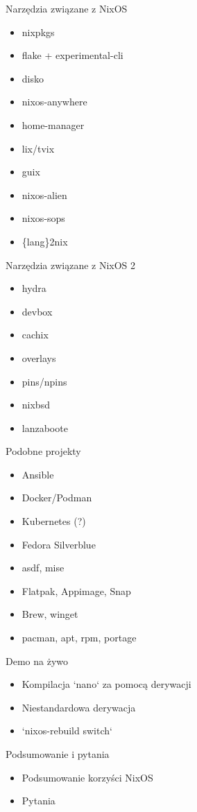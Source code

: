 \documentclass{beamer}
\begin{document}
\begin{frame}{Narzędzia związane z NixOS}
    \begin{itemize}
        \item nixpkgs
        \item flake + experimental-cli
        \item disko
        \item nixos-anywhere
        \item home-manager
        \item lix/tvix
        \item guix
        \item nixos-alien
        \item nixos-sops
        \item \{lang\}2nix
    \end{itemize}
\end{frame}

\begin{frame}{Narzędzia związane z NixOS 2}
    \begin{itemize}
        \item hydra
        \item devbox
        \item cachix
        \item overlays
        \item pins/npins
        \item nixbsd
        \item lanzaboote
    \end{itemize}
\end{frame}

\begin{frame}{Podobne projekty}
    \begin{itemize}
        \item Ansible
        \item Docker/Podman
        \item Kubernetes (?)
        \item Fedora Silverblue
        \item asdf, mise
        \item Flatpak, Appimage, Snap
        \item Brew, winget
        \item pacman, apt, rpm, portage
    \end{itemize}
\end{frame}

\begin{frame}{Demo na żywo}
    \begin{itemize}
        \item Kompilacja `nano` za pomocą derywacji
        \item Niestandardowa derywacja
        \item `nixos-rebuild switch`
    \end{itemize}
\end{frame}

\begin{frame}{Podsumowanie i pytania}
    \begin{itemize}
        \item Podsumowanie korzyści NixOS
        \item Pytania
    \end{itemize}
\end{frame}
\end{document}
